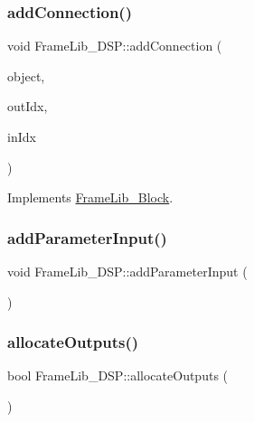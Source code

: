 \subsubsection{\texorpdfstring{add\+Connection()}{addConnection()}}
{\footnotesize\ttfamily void Frame\+Lib\+\_\+\+D\+S\+P\+::add\+Connection (\begin{DoxyParamCaption}\item[{\hyperlink{class_frame_lib___d_s_p}{Frame\+Lib\+\_\+\+D\+SP} $\ast$}]{object,  }\item[{unsigned long}]{out\+Idx,  }\item[{unsigned long}]{in\+Idx }\end{DoxyParamCaption})\hspace{0.3cm}{\ttfamily [virtual]}}



Implements \hyperlink{class_frame_lib___block_a58ad49f15453e8214a298ef0992b00a1}{Frame\+Lib\+\_\+\+Block}.

\mbox{\label{class_frame_lib___d_s_p_aa000b56c19ad1fbdc4f3fe56b0ca762d}} 
\subsubsection{\texorpdfstring{add\+Parameter\+Input()}{addParameterInput()}}
{\footnotesize\ttfamily void Frame\+Lib\+\_\+\+D\+S\+P\+::add\+Parameter\+Input (\begin{DoxyParamCaption}{ }\end{DoxyParamCaption})\hspace{0.3cm}{\ttfamily [protected]}}

\mbox{\label{class_frame_lib___d_s_p_abbf404ed95c61cfa713c988b10f76202}} 
\subsubsection{\texorpdfstring{allocate\+Outputs()}{allocateOutputs()}}
{\footnotesize\ttfamily bool Frame\+Lib\+\_\+\+D\+S\+P\+::allocate\+Outputs (\begin{DoxyParamCaption}{ }\end{DoxyParamCaption})\hspace{0.3cm}{\ttfamily [protected]}}

